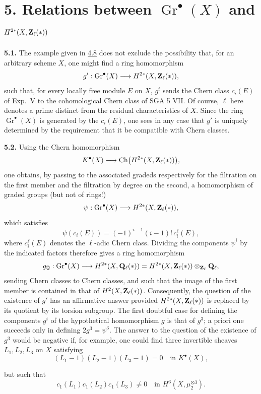 \section*{5. Relations between $\operatorname{Gr}^\bullet(X)$ and
$H^{2*}(X,\mathbf Z_\ell(*))$}

\noindent{}\textbf{5.1.}
The example given in \hyperlink{sga6.e14.para.4-8}{4.8} does not exclude the possibility that, for an
arbitrary scheme $X$, one might find a ring homomorphism
\[
 g':\operatorname{Gr}^\bullet(X)
 \longrightarrow H^{2*}(X,\mathbf Z_\ell(*)),
\]
such that, for every locally free module $E$ on $X$, $g^i$ sends the Chern
class $c_i(E)$ of Exp.~V to the cohomological Chern class of SGA 5 VII. Of
course, $\ell$ here denotes a prime distinct from the residual
characteristics of $X$. Since the ring $\operatorname{Gr}^\bullet(X)$ is
generated by the $c_i(E)$, one sees in any case that $g'$ is uniquely
determined by the requirement that it be compatible with Chern classes.

\noindent{}\textbf{5.2.}
Using the Chern homomorphism
\[
 K^\bullet(X)\longrightarrow
 \operatorname{Ch}\bigl(H^{2*}(X,\mathbf Z_\ell(*))\bigr),
\]
one obtains, by passing to the associated gradeds respectively for the
filtration on the first member and the filtration by degree on the second,
a homomorphism of graded groups (but not of rings!)
\[
 \psi:\operatorname{Gr}^\bullet(X)
 \longrightarrow H^{2*}(X,\mathbf Z_\ell(*)),
\]
which satisfies
\[
 \psi(c_i(E))=(-1)^{i-1}(i-1)!\,c_i^\ell(E),
\]
where $c_i^\ell(E)$ denotes the $\ell$-adic Chern class. Dividing the
components $\psi^i$ by the indicated factors therefore gives a ring
homomorphism
\[
 g_\mathbb Q:\operatorname{Gr}^\bullet(X)
 \longrightarrow H^{2*}(X,\mathbf Q_\ell(*))
 =H^{2*}(X,\mathbf Z_\ell(*))\otimes_{\mathbf Z_\ell}\mathbf Q_\ell,
\]
sending Chern classes to Chern classes, and such that the image of the first
member is contained in that of $H^2(X,\mathbf Z_\ell(*))$. Consequently, the question
of the existence of $g'$ has an affirmative answer provided
$H^{2*}(X,\mathbf Z_\ell(*))$ is replaced by its quotient by its torsion subgroup.
The first doubtful case for defining the components $g^i$ of the
hypothetical homomorphism $g$ is that of $g^3$; a priori one succeeds only
in defining $2g^3=\psi^3$. The answer to the question of the existence of
$g^3$ would be negative if, for example, one could find three invertible
sheaves $L_1,L_2,L_3$ on $X$ satisfying
\[
 (L_1-1)(L_2-1)(L_3-1)=0
 \quad\text{in }K^\bullet(X),
\]

but such that
\[
 c_1(L_1)c_1(L_2)c_1(L_3)\ne0
 \quad\text{in }H^6(X,\mu_2^{\otimes3}).
\]

